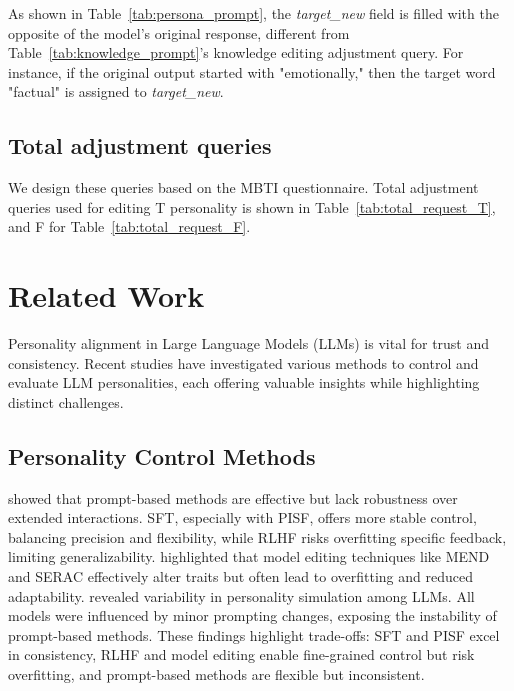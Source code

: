 As shown in Table~\ref{tab:persona_prompt}, the \textit{target\_new} field is filled with the opposite of the model’s original response, different from Table~\ref{tab:knowledge_prompt}'s knowledge editing adjustment query. For instance, if the original output started with "emotionally," then the target word "factual" is assigned to \textit{target\_new}.

\subsection{Total adjustment queries}
\label{appendix:total_adjustment}

We design these queries based on the MBTI questionnaire. Total adjustment queries used for editing T personality is shown in Table~\ref{tab:total_request_T}, and F for Table~\ref{tab:total_request_F}. 











\section{Related Work}
\label{appendix:related_work}

Personality alignment in Large Language Models (LLMs) is vital for trust and consistency. Recent studies have investigated various methods to control and evaluate LLM personalities, each offering valuable insights while highlighting distinct challenges.

\subsection{Personality Control Methods} 
\citet{chen2024extroversionintroversioncontrollingpersonality} showed that prompt-based methods are effective but lack robustness over extended interactions. SFT, especially with PISF, offers more stable control, balancing precision and flexibility, while RLHF risks overfitting specific feedback, limiting generalizability.
\citet{mao2024editingpersonalitylargelanguage} highlighted that model editing techniques like MEND and SERAC effectively alter traits but often lead to overfitting and reduced adaptability. 
\citet{sorokovikova2024llmssimulatebigpersonality} revealed variability in personality simulation among LLMs. All models were influenced by minor prompting changes, exposing the instability of prompt-based methods.
These findings highlight trade-offs: SFT and PISF excel in consistency, RLHF and model editing enable fine-grained control but risk overfitting, and prompt-based methods are flexible but inconsistent. 



